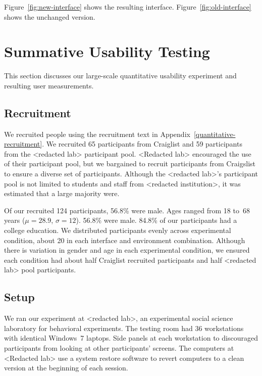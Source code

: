 \documentclass[USenglish,oneside,twocolumn]{article}
\begin{document}
Figure~\ref{fig:new-interface} shows the resulting interface.  Figure~\ref{fig:old-interface} shows the unchanged version. 

\section{Summative Usability Testing}
\label{sec:quantitative}
This section discusses our large-scale quantitative usability experiment and resulting user measurements. 

\subsection{Recruitment}
We recruited  people using the recruitment text in Appendix~\ref{quantitative-recruitment}. We recruited 65 participants from Craiglist and 59 participants from the <redacted lab> participant pool. <Redacted lab> encouraged the use of their participant pool, but we bargained to recruit participants from Craigslist to ensure a diverse set of participants. Although the <redacted lab>'s participant pool is not limited to students and staff from <redacted institution>, it was estimated that a large majority were. 

{\color {red} Of our recruited 124 participants, 56.8\% were male. Ages ranged from 18 to~68 years ($\mu = 28.9$, $\sigma = 12$). 56.8\% were male. 84.8\% of our participants had a college education.} We distributed participants evenly across experimental condition, about 20 in each interface and environment combination. Although there is variation in gender and age in each experimental condition, we ensured each condition had about half Craiglist recruited participants and half <redacted lab>  pool participants. 

\subsection{Setup}
We ran our experiment at <redacted lab>, an experimental social science laboratory for behavioral experiments. The testing room had 36 workstations with identical Windows~7 laptops. Side panels at each workstation to discouraged participants from looking at other participants' screens. 
The computers at <Redacted lab> use a system restore software to revert computers to a clean version at the beginning of each session. 
\end{document}

